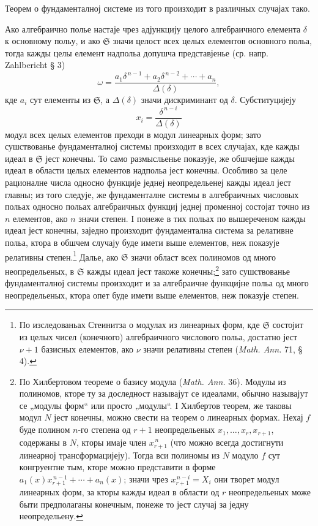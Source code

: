 ﻿\documentclass[11pt]{article}
\providecommand{\frS}{\mathfrak S}
\begin{document}
Теорем о фундаменталној системе из того произходит в различных случајах тако.

Ако алгебраично полье настаје чрез адјункцију целого алгебраичного елемента \(\delta\) к основному польу, и ако \(\frS\) значи целост всех целых елементов основного польа, тогда кажды целы елемент надпольа допушча представјенье (ср. напр. Zahlbericht § 3)
\[
\omega=\frac{a_1\delta^{\,n-1}+a_2\delta^{\,n-2}+\cdots+a_n}{\Delta(\delta)},
\]
кде \(a_i\) сут елементы из \(\frS\), а \(\Delta(\delta)\) значи дискриминант од \(\delta\). Субституцијеју
\[
x_i=\frac{\delta^{\,n-i}}{\Delta(\delta)}
\]
модул всех целых елементов преходи в модул линеарных форм; зато сушствованье фундаменталној системы произходит в всех случајах, кде кажды идеал в \(\frS\) јест конечны. То само размысльенье показује, же обшчејше кажды идеал в области целых елементов надпольа јест конечны. Особливо за целе рационалне числа односно функције једнеј неопредельенеј кажды идеал јест главны; из того следује, же фундаменталне системы в алгебраичных числовых польах односно польах алгебраичных функциј једнеј променној состојат точно из \(n\) елементов, ако \(n\) значи степен. I понеже в тих польах по вышереченом кажды идеал јест конечны, заједно произходит фундаментална система за релативне польа, ктора в обшчем случају буде имети выше елементов, неж показује релативны степен.\footnote{По изследованьах Стеинитза о модулах из линеарных форм, кде \(\frS\) состојит из целых чисел (конечного) алгебраичного числового польа, достатно јест \(\nu+1\) базисных елементов, ако \(\nu\) значи релативны степен (\emph{Math. Ann.} 71, § 4).} Далье, ако \(\frS\) значи област всех полиномов од много неопредельеных, в \(\frS\) кажды идеал јест такоже конечны;\footnote{По Хилбертовом теореме о базису модула (\emph{Math. Ann.} 36). Модулы из полиномов, кторе ту за доследност называјут се идеалами, обычно называјут се „модулы форм“ или просто „модулы“. I Хилбертов теорем, же таковы модул \(N\) јест конечны, можно свести на теорем о линеарных формах. Нехај \(f\) буде полином \(n\)-го степена од \(r+1\) неопредельеных \(x_1,\ldots,x_r,x_{r+1}\), содержаны в \(N\), кторы имаје член \(x_{r+1}^{\,n}\) (что можно всегда достигнути линеарној трансформацијеју). Тогда вси полиномы из \(N\) модуло \(f\) сут конгруентне тым, кторе можно представити в форме \(a_1(x)x_{r+1}^{\,n-1}+\cdots+a_n(x)\); значи чрез \(x_{r+1}^{\,n-i}=X_i\) они творет модул линеарных форм, за кторы кажды идеал в области од \(r\) неопредельеных може быти предполаганы конечным, понеже то јест случај за једну неопредельену.} зато сушствованье фундаменталној системы произходит и за алгебраичне функцијне польа од много неопредельеных, ктора опет буде имети выше елементов, неж показује степен.
\end{document}
